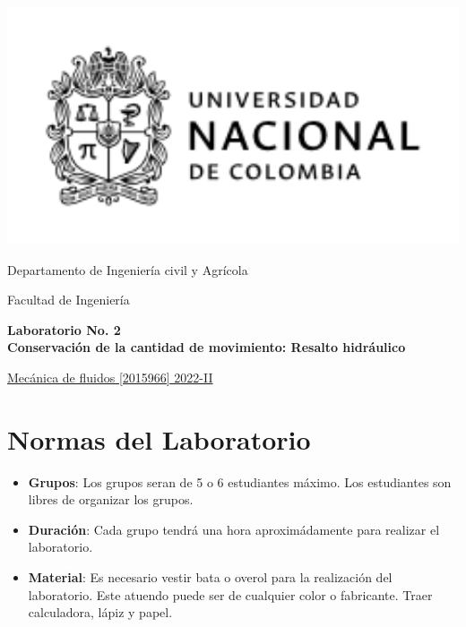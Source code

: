\documentclass[10pt, a4paper]{exam}
\begin{document}
	\noindent
	\begin{minipage}[l]{0.1\textwidth}
		\noindent
		\includegraphics[width=2.8\textwidth]{ESCUDO.png}
	\end{minipage}
\hfill
\begin{minipage}[c]{0.8\textwidth}
	\begin{center}
		{\large  Departamento de Ingeniería civil y Agrícola\par
		\large	Facultad de Ingeniería	\par
    \large \textbf{Laboratorio No. 2 \\ Conservaci\'on de la cantidad de movimiento: Resalto hidr\'aulico}	\par
} %
	\end{center}
\end{minipage}
\par
\vspace{0.2in}
\noindent
    \uline{Mecánica de fluidos [2015966]	\hfill 2022-II	}
\par 
\vspace{0.15in}
\noindent

\section{Normas del Laboratorio}
\begin{itemize}
    \item \textbf{Grupos}: Los grupos seran de 5 o 6 estudiantes m\'aximo. Los estudiantes son libres de organizar los grupos.
    \item \textbf{Duraci\'on}: Cada grupo tendr\'a una hora aproxim\'adamente  para realizar el laboratorio.
    \item \textbf{Material}: Es necesario vestir bata o overol para la realizaci\'on del laboratorio. Este atuendo puede ser de cualquier color o fabricante. Traer calculadora, l\'apiz y papel.
\end{itemize}
\end{document}
